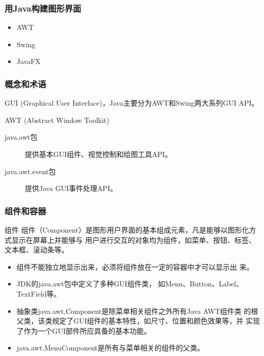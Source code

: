 \begin{frame}[fragile]
  \frametitle{用Java构建图形界面}

  \begin{itemize}
  \item AWT
  \item Swing
  \item JavaFX
  \end{itemize}
\end{frame}

\begin{frame}[fragile] %
  \frametitle{概念和术语}


  GUI (Graphical User Interface)，Java主要分为AWT和Swing两大系列GUI API。


  AWT (Abstract Window Toolkit)


  \begin{description}
  \item[java.awt包] 提供基本GUI组件、视觉控制和绘图工具API。
  \item[java.awt.event包] 提供Java GUI事件处理API。
  \end{description}
\end{frame}

\begin{frame}[fragile] %
  \frametitle{组件和容器}
  
  \begin{block}{组件}
    组件（Component）是图形用户界面的基本组成元素，凡是能够以图形化方式显示在屏幕上并能够与
    用户进行交互的对象均为组件，如菜单、按钮、标签、文本框、滚动条等。
  \end{block}

  \pause
  
  \begin{itemize}[<+-|alert@+>]\kai
  \item 组件不能独立地显示出来，必须将组件放在一定的容器中才可以显示出
    来。
  \item JDK的java.awt包中定义了多种GUI组件类，
    如Menu、Button、Label、TextField等。
  \item 抽象类java.awt.Component是除菜单相关组件之外所有Java AWT组件类
    的根父类，该类规定了GUI组件的基本特性，如尺寸、位置和颜色效果等，并
    实现了作为一个GUI部件所应具备的基本功能。
  \item java.awt.MenuComponent是所有与菜单相关的组件的父类。
  \end{itemize}
\end{frame}

